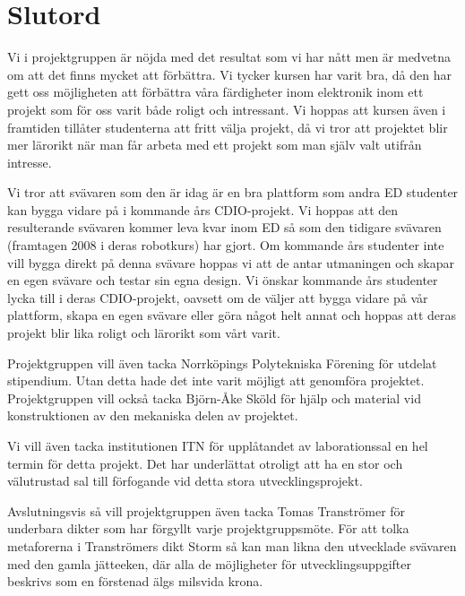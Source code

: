 \section{Slutord}
Vi i projektgruppen är nöjda med det resultat som vi har nått men är medvetna om
att det finns mycket att förbättra. Vi tycker kursen har varit bra, då den har
gett oss möjligheten att förbättra våra färdigheter inom elektronik inom ett
projekt som för oss varit både roligt och intressant. Vi hoppas att kursen även
i framtiden tillåter studenterna att fritt välja projekt, då vi tror att
projektet blir mer lärorikt när man får arbeta med ett projekt som man själv
valt utifrån intresse.

Vi tror att svävaren som den är idag är en bra plattform som andra ED studenter
kan bygga vidare på i kommande års CDIO-projekt. Vi hoppas att den resulterande
svävaren kommer leva kvar inom ED så som den tidigare svävaren (framtagen 2008 i
deras robotkurs) har gjort. Om kommande års studenter inte vill bygga direkt på
denna svävare hoppas vi att de antar utmaningen och skapar en egen svävare och
testar sin egna design. Vi önskar kommande års studenter lycka till i deras
CDIO-projekt, oavsett om de väljer att bygga vidare på vår plattform, skapa en
egen svävare eller göra något helt annat och hoppas att deras projekt blir lika
roligt och lärorikt som vårt varit.

Projektgruppen vill även tacka Norrköpings Polytekniska Förening för utdelat
stipendium. Utan detta hade det inte varit möjligt att genomföra projektet.
Projektgruppen vill också tacka Björn-Åke Sköld för hjälp och material vid
konstruktionen av den mekaniska delen av projektet.

Vi vill även tacka institutionen ITN för upplåtandet av laborationssal en hel
termin för detta projekt. Det har underlättat otroligt att ha en stor och
välutrustad sal till förfogande vid detta stora utvecklingsprojekt.

Avslutningsvis så vill projektgruppen även tacka Tomas Tranströmer för underbara
dikter som har förgyllt varje projektgruppsmöte. För att tolka metaforerna i
Tranströmers dikt Storm så kan man likna den utvecklade svävaren med den gamla
jätteeken, där alla de möjligheter för utvecklingsuppgifter beskrivs som en
förstenad älgs milsvida krona.
